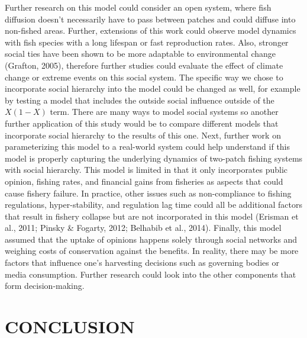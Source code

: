 \documentclass[
  12pt,
]{article}
\begin{document}
Further research on this model could consider an open system, where fish diffusion doesn't necessarily have to pass between patches and could diffuse into non-fished areas. Further, extensions of this work could observe model dynamics with fish species with a long lifespan or fast reproduction rates. Also, stronger social ties have been shown to be more adaptable to environmental change (Grafton, 2005), therefore further studies could evaluate the effect of climate change or extreme events on this social system. The specific way we chose to incorporate social hierarchy into the model could be changed as well, for example by testing a model that includes the outside social influence outside of the \(X(1-X)\) term. There are many ways to model social systems so another further application of this study would be to compare different models that incorporate social hierarchy to the results of this one. Next, further work on parameterizing this model to a real-world system could help understand if this model is properly capturing the underlying dynamics of two-patch fishing systems with social hierarchy. This model is limited in that it only incorporates public opinion, fishing rates, and financial gains from fisheries as aspects that could cause fishery failure. In practice, other issues such as non-compliance to fishing regulations, hyper-stability, and regulation lag time could all be additional factors that result in fishery collapse but are not incorporated in this model (Erisman et al., 2011; Pinsky \& Fogarty, 2012; Belhabib et al., 2014). Finally, this model assumed that the uptake of opinions happens solely through social networks and weighing costs of conservation against the benefits. In reality, there may be more factors that influence one's harvesting decisions such as governing bodies or media consumption. Further research could look into the other components that form decision-making.

\newpage

\hypertarget{conclusion}{%
\section{CONCLUSION}\label{conclusion}}
\end{document}
